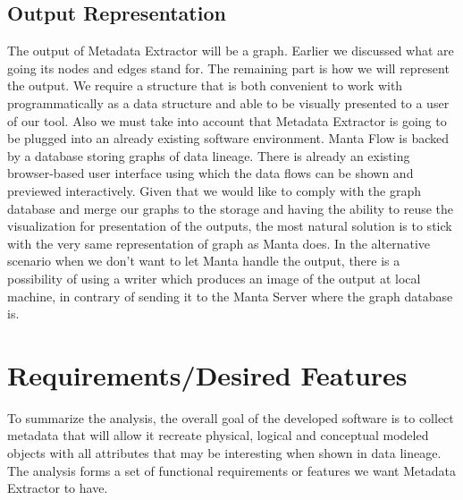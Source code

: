 \subsection{Output Representation}

The output of Metadata Extractor will be a graph. Earlier we discussed what are going its nodes and edges stand for. The remaining part is how we will represent the output. We require a structure that is both convenient to work with programmatically as a data structure and able to be visually presented to a user of our tool.
Also we must take into account that Metadata Extractor is going to be plugged into an already existing software environment. 
Manta Flow is backed by a database storing graphs of data lineage. There is already an existing browser-based user interface using which the data flows can be shown and previewed interactively. Given that we would like to comply with the graph database and merge our graphs to the storage and having the ability to reuse the visualization for presentation of the outputs, the most natural solution is to stick with the very same representation of graph as Manta does.
In the alternative scenario when we don't want to let Manta handle the output, there is a possibility of using a writer which produces an image of the output at local machine, in contrary of sending it to the Manta Server where the graph database is.


\section{Requirements/Desired Features}

To summarize the analysis, the overall goal of the developed software is to collect metadata that will allow it recreate physical, logical and conceptual modeled objects with all attributes that may be interesting when shown in data lineage. \\ 

The analysis forms a set of functional requirements or features we want Metadata Extractor to have.

